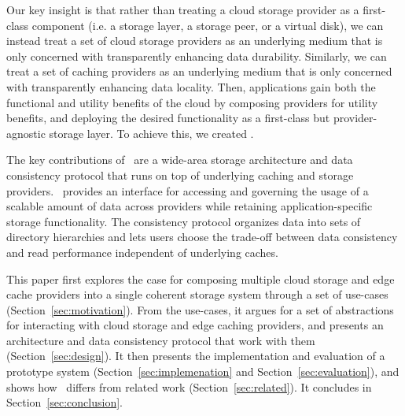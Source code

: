 Our key insight is that rather than treating a cloud storage provider as a
first-class component (i.e. a storage layer, a storage peer, or a virtual disk),
we can instead treat a set of cloud storage providers
as an underlying medium that is only concerned with transparently enhancing data durability.
Similarly, we can treat a set of caching providers as an underlying medium that is
only concerned with transparently enhancing data locality.  
Then, applications gain both the functional and utility benefits of the cloud by
composing providers for utility benefits, and deploying the desired functionality 
as a first-class but provider-agnostic storage layer.  To achieve this, we created \Syndicate.

The key contributions of \Syndicate\ are a wide-area storage architecture and data consistency protocol that runs on top of underlying caching and storage providers.  \Syndicate\ provides an interface for accessing and governing the usage of a scalable amount of data across providers while retaining application-specific storage functionality.  The consistency protocol organizes data into sets of directory hierarchies and lets users choose the trade-off between data consistency and read performance independent of underlying caches.

This paper first explores the case for composing multiple cloud storage and edge cache providers into a single coherent storage system through a set of use-cases (Section~\ref{sec:motivation}).  From the use-cases, it argues for a set of abstractions for interacting with cloud storage and edge caching providers, and presents an architecture and data consistency protocol that work with them (Section~\ref{sec:design}).  It then presents the implementation and evaluation of a prototype system (Section~\ref{sec:implemenation} and Section~\ref{sec:evaluation}), and shows how \Syndicate\ differs from related work (Section~\ref{sec:related}).  It concludes in Section~\ref{sec:conclusion}.




